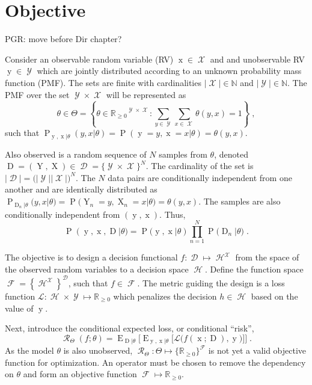 \documentclass[12pt]{report}
\DeclareMathOperator{\xrm}{\mathrm{x}}
\DeclareMathOperator{\Xrm}{\mathrm{X}}
\DeclareMathOperator{\yrm}{\mathrm{y}}
\DeclareMathOperator{\Yrm}{\mathrm{Y}}
\DeclareMathOperator{\Drm}{\mathrm{D}}
\DeclareMathOperator{\Prm}{\mathrm{P}}
\DeclareMathOperator{\Erm}{\mathrm{E}}
\DeclareMathOperator{\Xcal}{\mathcal{X}}
\DeclareMathOperator{\Ycal}{\mathcal{Y}}
\DeclareMathOperator{\Dcal}{\mathcal{D}}
\DeclareMathOperator{\Hcal}{\mathcal{H}}
\DeclareMathOperator{\Fcal}{\mathcal{F}}
\DeclareMathOperator{\Rcal}{\mathcal{R}}
\begin{document}
\section{Objective}

PGR: move before Dir chapter?

Consider an observable random variable (RV) $\xrm \in \Xcal$ and and unobservable RV $\yrm \in \Ycal$ which are jointly distributed according to an unknown probability mass function (PMF). The sets are finite with cardinalities $|\Xcal| \in \mathbb{N}$ and $|\Ycal| \in \mathbb{N}$. The PMF over the set $\Ycal \times \Xcal $ will be represented as
\begin{equation}
\theta \in \Theta = \left\{ \theta \in {\mathbb{R}_{\geq 0}}^{\Ycal \times \Xcal}: \sum_{y \in \Ycal} \sum_{x \in \Xcal}  \theta(y,x) = 1 \right\} \;,
\end{equation}
such that $\Prm_{\yrm,\xrm | \theta}(y,x | \theta) = \Prm(\yrm = y, \xrm = x | \theta) = \theta(y,x)$.

Also observed is a random sequence of $N$ samples from $\theta$, denoted $\Drm = ( \Yrm,\Xrm ) \in \Dcal = \{\Ycal \times \Xcal\}^N$. The cardinality of the set is $|\Dcal| = \big( |\Ycal| |\Xcal| \big)^N$. The $N$ data pairs are conditionally independent from one another and are identically distributed as $\Prm_{\Drm_n | \theta}(y,x | \theta) = \Prm\big( \Yrm_n = y, \Xrm_n = x | \theta \big) = \theta(y,x)$. The samples are also conditionally independent from $(\yrm,\xrm)$. Thus,
\begin{equation}
\Prm(\yrm,\xrm,\Drm | \theta) = \Prm(\yrm,\xrm | \theta) \prod_{n=1}^N \Prm\big( \Drm_n | \theta \big) \;.
\end{equation}

The objective is to design a decision functional $f: \Dcal \mapsto \Hcal^{\Xcal}$ from the space of the observed random variables to a decision space $\Hcal$. Define the function space $\Fcal = \left\{ {\Hcal^{\Xcal}} \right\}^{\Dcal}$, such that $f \in \Fcal$. The metric guiding the design is a loss function $\mathcal{L}: \Hcal \times \Ycal \mapsto \mathbb{R}_{\geq 0}$ which penalizes the decision $h \in \Hcal$ based on the value of $\yrm$. 

Next, introduce the conditional expected loss, or conditional ``risk'',
\begin{equation} \label{eq:risk_cond}
\Rcal_{\Theta}(f ; \theta) = \Erm_{\Drm | \theta} \bigg[ \Erm_{\yrm,\xrm | \theta} \Big[ \mathcal{L}\big( f(\xrm;\Drm),\yrm \big) \Big] \bigg] \;.
\end{equation}
As the model $\theta$ is also unobserved, $\Rcal_{\Theta}: \Theta \mapsto \{ \mathbb{R}_{\geq 0} \}^{\Fcal}$ is not yet a valid objective function for optimization. An operator must be chosen to remove the dependency on $\theta$ and form an objective function $\Fcal \mapsto \mathbb{R}_{\geq 0}$.
\end{document}

